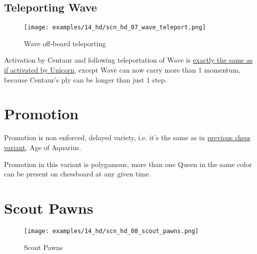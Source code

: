 \clearpage %

\subsection*{Teleporting Wave}

\vspace*{-1.2\baselineskip}
\noindent
\begin{figure}[!h]
\texttt{[image: examples/14\_hd/scn\_hd\_07\_wave\_teleport.png]}
\caption{Wave off-board teleporting}
\label{fig:scn_hd_07_wave_teleport}
\end{figure}

Activation by Centaur and following teleportation of Wave is
\hyperref[fig:scn_n_07_teleport_wave_init]{exactly the same as if activated by Unicorn},
except Wave can now carry more than 1 momentum, because Centaur's ply can be
longer than just 1 step.

\clearpage %

\section*{Promotion}

Promotion is non enforced, delayed variety, i.e. it's the same as in
\hyperref[sec:Age of Aquarius/Promotion]{previous chess variant}, Age of Aquarius.

Promotion in this variant is polygamous, more than one Queen in the same color
can be present on chessboard at any given time.

\clearpage %

\section*{Scout Pawns}

\vspace*{-1.3\baselineskip}
\noindent
\begin{figure}[!h]
\texttt{[image: examples/14\_hd/scn\_hd\_08\_scout\_pawns.png]}
\caption{Scout Pawns}
\label{fig:scn_hd_08_scout_pawns}
\end{figure}

